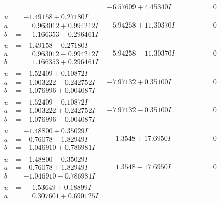 \documentclass[1p]{elsarticle_modified}
\theoremstyle{definition}
\begin{document}
$$\begin{array}{c|c|c}
 & -6.57609 + 4.45340 I & \phantom{-0.000000 } 0 \\ \hline\begin{aligned}
u &= -1.49158 + 0.27180 I \\
a &= \phantom{-}0.963012 + 0.994212 I \\
b &= \phantom{-}1.166353 - 0.296461 I\end{aligned}
 & -5.94258 + 11.30370 I & \phantom{-0.000000 } 0 \\ \hline\begin{aligned}
u &= -1.49158 - 0.27180 I \\
a &= \phantom{-}0.963012 - 0.994212 I \\
b &= \phantom{-}1.166353 + 0.296461 I\end{aligned}
 & -5.94258 - 11.30370 I & \phantom{-0.000000 } 0 \\ \hline\begin{aligned}
u &= -1.52409 + 0.10872 I \\
a &= -1.003222 - 0.242752 I \\
b &= -1.076996 + 0.004087 I\end{aligned}
 & -7.97132 + 0.35100 I & \phantom{-0.000000 } 0 \\ \hline\begin{aligned}
u &= -1.52409 - 0.10872 I \\
a &= -1.003222 + 0.242752 I \\
b &= -1.076996 - 0.004087 I\end{aligned}
 & -7.97132 - 0.35100 I & \phantom{-0.000000 } 0 \\ \hline\begin{aligned}
u &= -1.48800 + 0.35029 I \\
a &= -0.76078 - 1.82949 I \\
b &= -1.046910 + 0.786981 I\end{aligned}
 & \phantom{-}1.3548 + 17.6950 I & \phantom{-0.000000 } 0 \\ \hline\begin{aligned}
u &= -1.48800 - 0.35029 I \\
a &= -0.76078 + 1.82949 I \\
b &= -1.046910 - 0.786981 I\end{aligned}
 & \phantom{-}1.3548 - 17.6950 I & \phantom{-0.000000 } 0 \\ \hline\begin{aligned}
u &= \phantom{-}1.53649 + 0.18899 I \\
a &= \phantom{-}0.307601 + 0.690125 I \\

\end{aligned}
\end{array}$$
\end{document}
